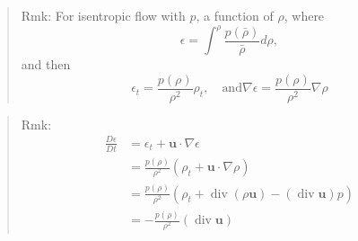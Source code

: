 \begin{quote}
	Rmk: For isentropic flow with $p$, a function of $\rho$, where
\begin{equation}
\epsilon = \int^{\rho} \frac{p(\bar{\rho})}{\bar{\rho}}d\rho,
\end{equation}
and then
\begin{equation}
\epsilon_t = \frac{p(\rho)}{\rho^2}\rho_t,\quad\text{and}\nabla \epsilon = \frac{p(\rho)}{\rho^2}\nabla \rho
\end{equation}


\end{quote}

\begin{quote}
	Rmk:
\begin{equation}
\begin{aligned}
\frac{D\epsilon}{Dt}
&= \epsilon_t + \textbf{u}\cdot \nabla \epsilon\\
&= \frac{p(\rho)}{\rho^2} (\rho_t + \textbf{u}\cdot \nabla\rho)\\
&= \frac{p(\rho)}{\rho^2}\left(\rho_t + \operatorname{div}(\rho\textbf{u}) - (\operatorname{div}\textbf{u})p\right)\\
&= -\frac{p(\rho)}{\rho^2}\left(\operatorname{div}\textbf{u}\right)
\end{aligned}
\end{equation}

\end{quote}
